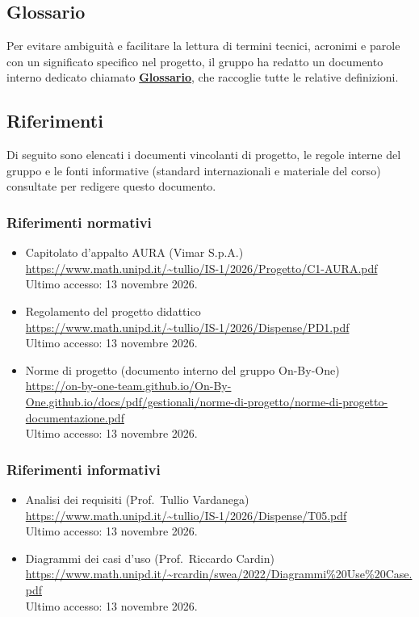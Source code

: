 \documentclass[11pt, a4paper]{article}
\begin{document}
\subsection{Glossario}
Per evitare ambiguità e facilitare la lettura di termini tecnici, acronimi e parole con un significato specifico nel progetto, il gruppo ha redatto un documento interno dedicato chiamato \textbf{\href{https://on-by-one-team.github.io/On-By-One.github.io/docs/pdf/gestionali/glossario.pdf}{Glossario}}, che raccoglie tutte le relative definizioni.

\subsection{Riferimenti}
Di seguito sono elencati i documenti vincolanti di progetto, le regole interne del gruppo e le fonti informative (standard internazionali e materiale del corso) consultate per redigere questo documento.

\subsubsection{Riferimenti normativi}
\begin{itemize}
    \item Capitolato d'appalto AURA (Vimar S.p.A.) \\
    \url{https://www.math.unipd.it/~tullio/IS-1/2026/Progetto/C1-AURA.pdf} \\
    Ultimo accesso: 13 novembre 2026.

    \item Regolamento del progetto didattico \\
    \url{https://www.math.unipd.it/~tullio/IS-1/2026/Dispense/PD1.pdf} \\
    Ultimo accesso: 13 novembre 2026.

    \item Norme di progetto (documento interno del gruppo On-By-One) \\
    \url{https://on-by-one-team.github.io/On-By-One.github.io/docs/pdf/gestionali/norme-di-progetto/norme-di-progetto-documentazione.pdf} \\
    Ultimo accesso: 13 novembre 2026.
\end{itemize}

\subsubsection{Riferimenti informativi}
\begin{itemize}
    \item Analisi dei requisiti (Prof.\ Tullio Vardanega) \\
    \url{https://www.math.unipd.it/~tullio/IS-1/2026/Dispense/T05.pdf} \\
    Ultimo accesso: 13 novembre 2026.

    \item Diagrammi dei casi d'uso (Prof.\ Riccardo Cardin) \\
    \url{https://www.math.unipd.it/~rcardin/swea/2022/Diagrammi%20Use%20Case.pdf} \\
    Ultimo accesso: 13 novembre 2026.
\end{itemize}
\end{document}
